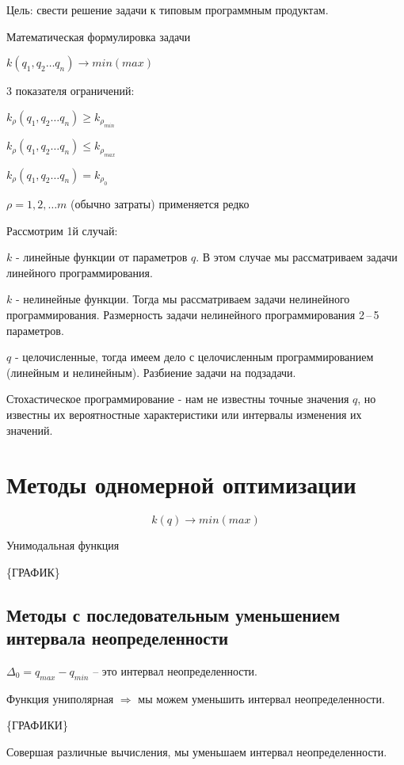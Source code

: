 \documentclass[12pt,a5paper]{scrbook}
\begin{document}
  Цель: свести решение задачи к типовым программным продуктам.\par
  Математическая формулировка задачи\par
  \(
  k(q_1, q_2\ldots q_n)\to min (max)
  \)
  \par
  3 показателя ограничений:\par
  \(
  k_{\rho}(q_1, q_2\ldots q_n)\geq k_{\rho_{min}}
  \)\par
  \(
  k_{\rho}(q_1, q_2\ldots q_n)\leq k_{\rho_{max}}
  \)\par
  \(
  k_{\rho}(q_1, q_2\ldots q_n) = k_{\rho_{0}}
  \)\par
  $\rho = 1, 2, \ldots m$ (обычно затраты) применяется редко\par
  Рассмотрим 1й случай:\par
  $k$ - линейные функции от параметров $q$. В этом случае мы рассматриваем задачи линейного программирования.\par
  $k$ - нелинейные функции. Тогда мы рассматриваем задачи нелинейного программирования. Размерность задачи нелинейного программирования 2\,--\,5 параметров.\par
  $q$ - целочисленные, тогда имеем дело с целочисленным программированием (линейным и нелинейным). Разбиение задачи на подзадачи.\par
  Стохастическое программирование - нам не известны точные значения $q$, но известны их вероятностные характеристики или интервалы изменения их значений.\par
  \chapter{Методы одномерной оптимизации}
  \pagestyle{headings}
  $$k(q)\to min(max)$$\par
  Унимодальная функция\par
  \{ГРАФИК\}\par
  \section{Методы с последовательным уменьшением интервала неопределенности}
  $\Delta_0 = q_{max} - q_{min}$ -- это интервал неопределенности.\par
  Функция униполярная $\Rightarrow$ мы можем уменьшить интервал неопределенности.\par
  \{ГРАФИКИ\}\par
  Совершая различные вычисления, мы уменьшаем интервал неопределенности.
  \newpage
\end{document}
